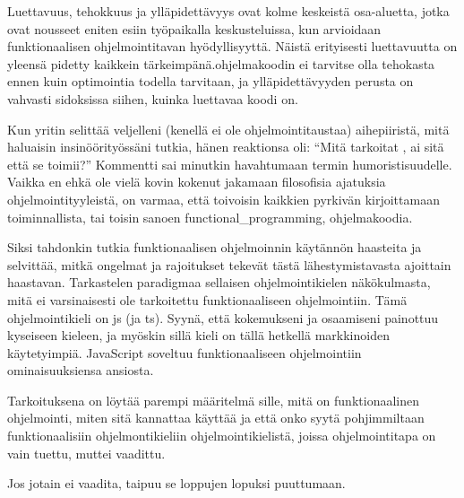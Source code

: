 Luettavuus, tehokkuus ja ylläpidettävyys ovat kolme keskeistä osa-aluetta, jotka ovat nousseet eniten esiin työpaikalla keskusteluissa, kun arvioidaan funktionaalisen ohjelmointitavan hyödyllisyyttä. Näistä erityisesti luettavuutta on yleensä pidetty kaikkein tärkeimpänä.ohjelmakoodin ei tarvitse olla tehokasta ennen kuin optimointia todella tarvitaan, ja ylläpidettävyyden perusta on vahvasti sidoksissa siihen, kuinka luettavaa koodi on.

Kun yritin selittää veljelleni (kenellä ei ole ohjelmointitaustaa) aihepiiristä, mitä haluaisin insinöörityössäni tutkia, hänen reaktionsa oli: \enquote{Mitä tarkoitat , ai sitä että se toimii?} Kommentti sai minutkin havahtumaan termin humoristisuudelle. Vaikka en ehkä ole vielä kovin kokenut jakamaan filosofisia ajatuksia ohjelmointityyleistä, on varmaa, että toivoisin kaikkien pyrkivän kirjoittamaan toiminnallista, tai toisin sanoen \gls{functional_programming}, ohjelmakoodia.

Siksi tahdonkin tutkia funktionaalisen ohjelmoinnin käytännön haasteita ja selvittää, mitkä ongelmat ja rajoitukset tekevät tästä lähestymistavasta ajoittain haastavan. Tarkastelen paradigmaa sellaisen ohjelmointikielen näkökulmasta, mitä ei varsinaisesti ole tarkoitettu funktionaaliseen ohjelmointiin. Tämä ohjelmointikieli on \gls{js} (ja \gls{ts}). Syynä, että kokemukseni ja osaamiseni painottuu kyseiseen kieleen, ja myöskin sillä kieli on tällä hetkellä markkinoiden käytetyimpiä. JavaScript soveltuu funktionaaliseen ohjelmointiin ominaisuuksiensa ansiosta.

Tarkoituksena on löytää parempi määritelmä sille, mitä on funktionaalinen ohjelmointi, miten sitä kannattaa käyttää ja että onko syytä pohjimmiltaan funktionaalisiin ohjelmontikieliin ohjelmointikielistä, joissa ohjelmointitapa on vain tuettu, muttei vaadittu.

Jos jotain ei vaadita, taipuu se loppujen lopuksi puuttumaan.


